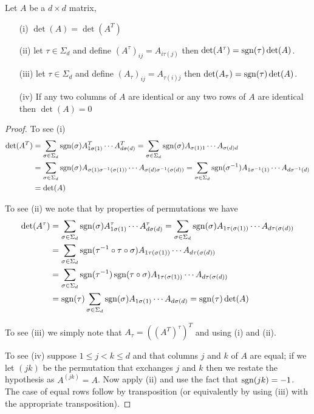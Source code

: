 \begin{prop}\label{DeterminantUnderPermutationTranspose}Let $A$ be a $d \times d$ matrix, 
\begin{itemize}
\item[(i)] $\det(A) = \det(A^T)$
\item[(ii)] let $\tau \in \Sigma_d$ and define $(A^\tau)_{ij} = A_{i \tau(j)}$ then $\det(A^\tau) = \operatorname*{sgn}(\tau) \det(A)$. 
\item[(iii)] let $\tau \in \Sigma_d$ and define $(A_\tau)_{ij} = A_{\tau(i) j}$ then $\det(A_\tau) = \operatorname*{sgn}(\tau) \det(A)$. 
\item[(iv)] If any two columns of $A$ are identical or any two rows of $A$ are identical then $\det(A) = 0$
\end{itemize}
\end{prop}
\begin{proof}
To see (i)
\begin{align*}
\det(A^T) &= \sum_{\sigma \in \Sigma_d} \operatorname*{sgn}(\sigma) A^T_{1\sigma(1)} \dotsb A^T_{d \sigma(d)} = \sum_{\sigma \in \Sigma_d} \operatorname*{sgn}(\sigma) A_{\sigma(1) 1} \dotsb A_{\sigma(d) d} \\
&= \sum_{\sigma \in \Sigma_d} \operatorname*{sgn}(\sigma) A_{\sigma(1) \sigma^{-1}(\sigma(1))} \dotsb A_{\sigma(d) \sigma^{-1}(\sigma(d))} 
= \sum_{\sigma \in \Sigma_d} \operatorname*{sgn}(\sigma^{-1}) A_{1 \sigma^{-1}(1)} \dotsb A_{d \sigma^{-1}(d)}  \\
&= \det(A)
\end{align*}
 
To see (ii) we note that by properties of permutations we have
\begin{align*}
\det(A^\tau) &= \sum_{\sigma \in \Sigma_d} \operatorname*{sgn}(\sigma) A^\tau_{1\sigma(1)} \dotsb A^\tau_{d \sigma(d)} 
= \sum_{\sigma \in \Sigma_d} \operatorname*{sgn}(\sigma) A_{1 \tau(\sigma(1))} \dotsb A_{d \tau(\sigma(d))} \\
&= \sum_{\sigma \in \Sigma_d} \operatorname*{sgn}(\tau^{-1} \circ \tau \circ \sigma) A_{1 \tau(\sigma(1))} \dotsb A_{d \tau(\sigma(d))}  \\
&= \sum_{\sigma \in \Sigma_d} \operatorname*{sgn}(\tau^{-1} ) \operatorname*{sgn}( \tau \circ \sigma) A_{1 \tau(\sigma(1))} \dotsb A_{d \tau(\sigma(d))} \\
&= \operatorname*{sgn}(\tau )\sum_{\sigma \in \Sigma_d} \operatorname*{sgn}( \sigma) A_{1 \sigma(1)} \dotsb A_{d \sigma(d)} = \operatorname*{sgn}(\tau) \det(A)
\end{align*}

To see (iii) we simply note that $A_\tau = ((A^T)^\tau)^T$ and using (i) and (ii).

To see (iv) suppose $1 \leq j < k \leq d$ and that columns $j$ and $k$ of $A$ are equal; if we let $(j k)$ be the permutation that exchanges $j$ and $k$ then we restate the hypothesis as $A^{(j k)} = A$.  Now apply (ii) and use the fact that $\operatorname*{sgn}( j k) = -1$.  The case of equal rows follow by transposition (or equivalently by using (iii) with the appropriate transposition).
\end{proof}

